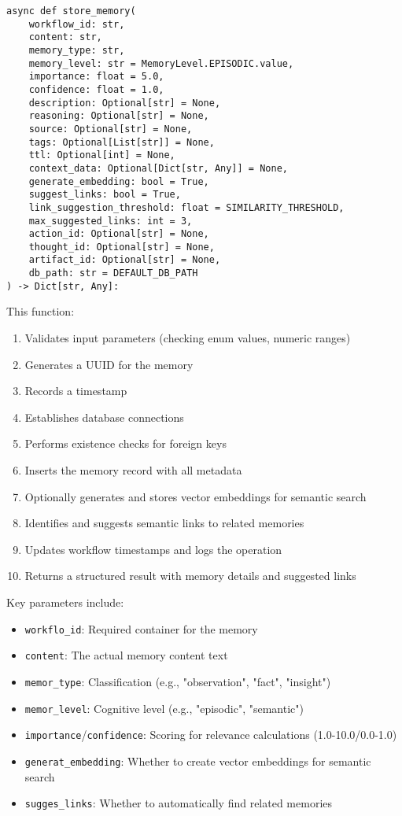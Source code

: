 \documentclass[12pt,a4paper]{article}
\newcommand{\code}[1]{\texttt{#1}}
\begin{document}
\begin{pageablecode}
\begin{verbatim}
async def store_memory(
    workflow_id: str,
    content: str,
    memory_type: str,
    memory_level: str = MemoryLevel.EPISODIC.value,
    importance: float = 5.0,
    confidence: float = 1.0,
    description: Optional[str] = None,
    reasoning: Optional[str] = None,
    source: Optional[str] = None,
    tags: Optional[List[str]] = None,
    ttl: Optional[int] = None,
    context_data: Optional[Dict[str, Any]] = None,
    generate_embedding: bool = True,
    suggest_links: bool = True,
    link_suggestion_threshold: float = SIMILARITY_THRESHOLD,
    max_suggested_links: int = 3,
    action_id: Optional[str] = None,
    thought_id: Optional[str] = None,
    artifact_id: Optional[str] = None,
    db_path: str = DEFAULT_DB_PATH
) -> Dict[str, Any]:
\end{verbatim}
\end{pageablecode}

This function:
\begin{enumerate}[label=\arabic*.]
    \item Validates input parameters (checking enum values, numeric ranges)
    \item Generates a UUID for the memory
    \item Records a timestamp
    \item Establishes database connections
    \item Performs existence checks for foreign keys
    \item Inserts the memory record with all metadata
    \item Optionally generates and stores vector embeddings for semantic search
    \item Identifies and suggests semantic links to related memories
    \item Updates workflow timestamps and logs the operation
    \item Returns a structured result with memory details and suggested links
\end{enumerate}

Key parameters include:
\begin{itemize}
    \item \code{workflo\1\_id}: Required container for the memory
    \item \code{content}: The actual memory content text
    \item \code{memor\1\_type}: Classification (e.g., "observation", "fact", "insight")
    \item \code{memor\1\_level}: Cognitive level (e.g., "episodic", "semantic")
    \item \code{importance}/\code{confidence}: Scoring for relevance calculations (1.0-10.0/0.0-1.0)
    \item \code{generat\1\_embedding}: Whether to create vector embeddings for semantic search
    \item \code{sugges\1\_links}: Whether to automatically find related memories
\end{itemize}
\end{document}
